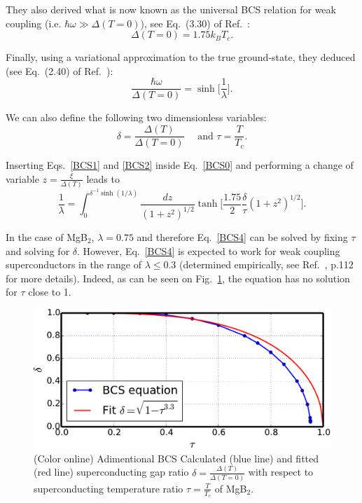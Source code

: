 \documentclass[final,3p,times,twocolumn]{elsarticle}
\begin{document}
They also derived what is now known as the universal BCS relation for weak coupling (i.e. $\hbar\omega \gg \Delta(T=0)$), see Eq.~(3.30) of Ref.~\cite{Bardeen1957}: 
\begin{equation}\label{BCS1}
\Delta(T=0) = 1.75 k_B T_c.
\end{equation}

Finally, using a variational approximation to the true ground-state, they deduced (see Eq.~(2.40) of Ref.~\cite{Bardeen1957}):
\begin{equation}\label{BCS2}
\frac{\hbar\omega}{\Delta(T=0)} = \sinh\Big[\frac{1}{\lambda}\Big].
\end{equation}

We can also define the following two dimensionless variables:
\begin{equation}
\delta = \frac{\Delta(T)}{\Delta(T=0)} \quad \text{ and } \tau = \frac{T}{T_c}.
\end{equation}

Inserting Eqs.~\eqref{BCS1} and \eqref{BCS2} inside Eq.~\eqref{BCS0} and performing a change of variable $z = \frac{\xi}{\Delta(T)}$ leads to~\cite{Johnston2013}
\begin{equation}\label{BCS4}
\frac{1}{\lambda} = \int_0^{\delta^{-1}\sinh(1/\lambda)} \frac{dz}{(1+z^2)^{1/2}} \tanh\Big[\frac{1.75}{2}\frac{\delta}{\tau} (1+z^2)^{1/2} \Big].
\end{equation}

In the case of MgB$_2$, $\lambda = 0.75$ and therefore Eq.~\eqref{BCS4} can be solved by fixing $\tau$ and solving for $\delta$. 
However, Eq.~\eqref{BCS4} is expected to work for weak coupling superconductors in the range of $\lambda \le 0.3$ (determined empirically, see Ref.~\cite{Gennes1999}, p.112 for more details).
Indeed, as can be seen on Fig.~\ref{MgB2-BCS-fit}, the equation has no solution for $\tau$ close to 1. 

\begin{figure}[t!]
  \centering
  \includegraphics[width=0.99\linewidth]{MgB2_bcs_fit.pdf}
  \caption{\label{MgB2-BCS-fit} (Color online) Adimentional BCS Calculated (blue line) and fitted (red line) superconducting gap ratio $\delta = \frac{\Delta(T)}{\Delta(T=0)}$ with respect to superconducting temperature ratio $\tau = \frac{T}{T_c}$ of MgB$_2$. }
\end{figure}
\end{document}
